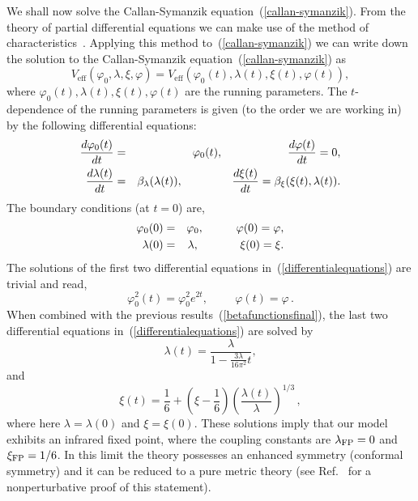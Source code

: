 \documentclass[aps,12pt,superscriptaddress,preprintnumbers,
                secnumarabic,nofootinbib,showpacs]{revtex4}
\begin{document}
We shall now solve the Callan-Symanzik
equation~(\ref{callan-symanzik}). From the theory of partial
differential equations we can make use of the method of
characteristics~\cite{Buchbinder:1992rb,Elizalde:1993ew,cc,bkmn}. 
Applying this method to~(\ref{callan-symanzik}) 
we can write down the solution to the
Callan-Symanzik equation~(\ref{callan-symanzik}) as
\begin{equation}
V_{\mathrm{eff}}(\varphi_0, \lambda, \xi, \varphi) =
V_{\mathrm{eff}}(\varphi_0(t), \lambda (t), \xi(t), \varphi (t)),
\label{solutionofC-S}
\end{equation}
where $\varphi_0(t), \lambda(t), \xi(t), \varphi(t)$ are the running
parameters. The $t$-dependence of the running parameters is given
(to the order we are working in) by the following
differential equations:
\begin{eqnarray}
\frac{d\varphi_0(t)}{dt} & = & \varphi_0(t),
\hspace{2cm}
\frac{d\varphi(t)}{dt} = 0,
\nonumber\\
\frac{d\lambda(t)}{dt} & = & \beta_{\lambda}(\lambda (t)),
\hspace{1.52cm} \frac{d\xi(t)}{dt} =  \beta_{\xi}(\xi(t),
\lambda(t)). \label{differentialequations}
\end{eqnarray}
The boundary conditions (at $t=0$) are,
\begin{eqnarray}
\varphi_0(0) & = & \varphi_0, \hspace{1cm}
\varphi(0) = \varphi,\nonumber\\
\lambda(0) & = & \lambda, \hspace{1.27cm} \xi(0) = \xi.
\end{eqnarray}
The solutions of the first two differential equations
in~(\ref{differentialequations}) are trivial and read,
\begin{equation}
\varphi_0^2(t) = \varphi_0^2e^{2t}, \hspace{1cm} \varphi(t) = \varphi
\,.
\end{equation}
When combined with the previous results~(\ref{betafunctionsfinal}),
the last two differential equations
in~(\ref{differentialequations}) are solved by
\begin{equation}
\lambda(t) = \frac{\lambda}{1-\frac{3\lambda}{16\pi^2}t},
\label{running:lambda}
\end{equation}
and
\begin{equation}
\xi(t) = \frac16 + (\xi -
\frac16)\left(\frac{\lambda(t)}{\lambda}\right)^{1/3}
\,,
\label{running:xi}
\end{equation}
where here $\lambda=\lambda(0)$ and $\xi=\xi(0)$.
 These solutions imply that our model exhibits an infrared
fixed point, where the coupling constants are $\lambda_{\rm FP} = 0$
and $\xi_{\rm FP} = 1/6$. In this limit the theory possesses
an enhanced symmetry (conformal symmetry) and
it can be reduced to a pure metric theory
(see Ref.~\cite{Tsamis:1984hh} for a nonperturbative proof of this statement). 
\end{document}
